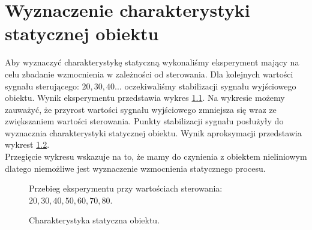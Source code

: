 \chapter{Wyznaczenie charakterystyki statycznej obiektu}
\label{lab2}

Aby wyznaczyć charakterystykę statyczną wykonaliśmy eksperyment mający na celu zbadanie wzmocnienia w zależności od sterowania. Dla kolejnych wartości sygnału sterującego: $20, 30, 40...$ oczekiwaliśmy stabilizacji sygnału wyjściowego obiektu. Wynik eksperymentu przedstawia wykres \ref{eksperyment}. Na wykresie możemy zauważyć, że przyrost wartości sygnału wyjściowego zmniejsza się wraz ze zwiększaniem wartości sterowania. Punkty stabilizacji sygnału posłużyły do wyznacznia charakterystyki statycznej obiektu. Wynik aproksymacji przedstawia wykrest \ref{char_stat}.\\
\indent{} Przegięcie wykresu wskazuje na to, że mamy do czynienia z obiektem nieliniowym dlatego niemożliwe jest wyznaczenie wzmocnienia statycznego procesu.

\begin{figure}[t]
    \centering
    \caption{Przebieg eksperymentu przy wartościach sterowania: $20, 30, 40, 50, 60, 70, 80$.}
    \label{eksperyment}
\end{figure}

\begin{figure}[b]
    \centering
    \caption{Charakterystyka statyczna obiektu.}
    \label{char_stat}
\end{figure}
